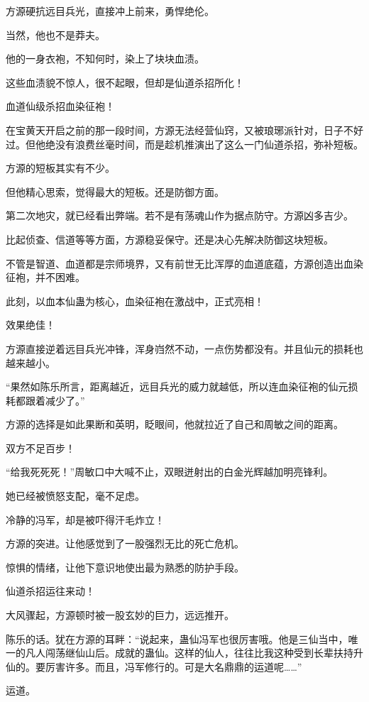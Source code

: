 \begin{this_body}
方源硬抗远目兵光，直接冲上前来，勇悍绝伦。

当然，他也不是莽夫。

他的一身衣袍，不知何时，染上了块块血渍。

这些血渍貌不惊人，很不起眼，但却是仙道杀招所化！

血道仙级杀招血染征袍！

在宝黄天开启之前的那一段时间，方源无法经营仙窍，又被琅琊派针对，日子不好过。但他绝没有浪费丝毫时间，而是趁机推演出了这么一门仙道杀招，弥补短板。

方源的短板其实有不少。

但他精心思索，觉得最大的短板。还是防御方面。

第二次地灾，就已经看出弊端。若不是有荡魂山作为据点防守。方源凶多吉少。

比起侦查、信道等等方面，方源稳妥保守。还是决心先解决防御这块短板。

不管是智道、血道都是宗师境界，又有前世无比浑厚的血道底蕴，方源创造出血染征袍，并不困难。

此刻，以血本仙蛊为核心，血染征袍在激战中，正式亮相！

效果绝佳！

方源直接逆着远目兵光冲锋，浑身岿然不动，一点伤势都没有。并且仙元的损耗也越来越小。

“果然如陈乐所言，距离越近，远目兵光的威力就越低，所以连血染征袍的仙元损耗都跟着减少了。”

方源的选择是如此果断和英明，眨眼间，他就拉近了自己和周敏之间的距离。

双方不足百步！

“给我死死死！”周敏口中大喊不止，双眼迸射出的白金光辉越加明亮锋利。

她已经被愤怒支配，毫不足虑。

冷静的冯军，却是被吓得汗毛炸立！

方源的突进。让他感觉到了一股强烈无比的死亡危机。

惊惧的情绪，让他下意识地使出最为熟悉的防护手段。

仙道杀招运往来动！

大风骤起，方源顿时被一股玄妙的巨力，远远推开。

陈乐的话。犹在方源的耳畔：“说起来，蛊仙冯军也很厉害哦。他是三仙当中，唯一的凡人闯荡继仙山后。成就的蛊仙。这样的仙人，往往比我这种受到长辈扶持升仙的。要厉害许多。而且，冯军修行的。可是大名鼎鼎的运道呢……”

运道。


\end{this_body}
